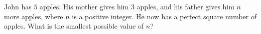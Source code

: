 John has $5$ apples. His mother gives him $3$ apples, and his father gives him $n$ more apples, where $n$ is a positive integer. He now has a perfect square number of apples. What is the smallest possible value of $n$?
